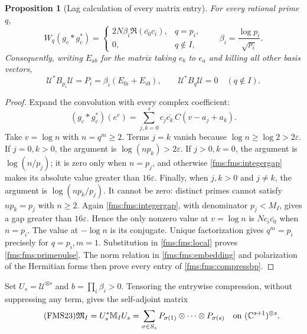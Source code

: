 \documentclass[11pt,a4paper]{article}
\newtheorem{proposition}[theorem]{Proposition}
\theoremstyle{definition}\newtheorem{definition}[theorem]{Definition}
\newcommand{\C}{\mathbb C}\newcommand{\R}{\mathbb R}
\begin{document}
\begin{proposition}[Lag calculation of every matrix entry]
\label{fms:fms:compression}
For every rational prime $q$,
\begin{equation}\tag{FMS21}\label{fms:fms:primepulse}
 W_q(g_c*g_c^*)=
 \begin{cases}
 2N\beta_i\Re(\overline{c_0}c_i),&q=p_i,\\
 0,&q\notin I,
 \end{cases}
 \qquad \beta_i=\dfrac{\log p_i}{\sqrt{p_i}}.
\end{equation}
Consequently, writing $E_{ab}$ for the matrix taking $e_b$ to
$e_a$ and killing all other basis vectors,
\begin{equation}\tag{FMS22}\label{fms:fms:compressbp}
 \mathcal U^*B_{p_i}\mathcal U=P_i
       =\beta_i(E_{0i}+E_{i0}),\qquad
 \mathcal U^*B_q\mathcal U=0\quad(q\notin I).
\end{equation}
\end{proposition}
\begin{proof}
Expand the convolution with every complex coefficient:
\[
 (g_c*g_c^*)(e^v)=
 \sum_{j,k=0}^s c_j\overline{c_k}\,
                  C(v-a_j+a_k).
\]
Take $v=\log n$ with $n=q^m\ge2$. Terms $j=k$ vanish because
$\log n\ge\log2>2\varepsilon$. If $j=0,k>0$, the argument is
$\log(np_k)>2\varepsilon$. If $j>0,k=0$, the argument is
$\log(n/p_j)$; it is zero only when $n=p_j$, and otherwise
\eqref{fms:fms:integergap} makes its absolute value greater than
$16\varepsilon$. Finally, when $j,k>0$ and $j\ne k$, the
argument is $\log(np_k/p_j)$. It cannot be zero: distinct primes
cannot satisfy $np_k=p_j$ with $n\ge2$. Again
\eqref{fms:fms:integergap}, with denominator $p_j<M_I$, gives a
gap greater than $16\varepsilon$. Hence the only nonzero value
at $v=\log n$ is $Nc_i\overline{c_0}$ when $n=p_i$.
The value at $-\log n$ is its conjugate. Unique factorization
gives $q^m=p_i$ precisely for $q=p_i,m=1$.
Substitution in \eqref{fms:fms:local} proves
\eqref{fms:fms:primepulse}. The norm relation in
\eqref{fms:fms:embedding} and polarization of the Hermitian forms
then prove every entry of \eqref{fms:fms:compressbp}.
\end{proof}

Set $U_s=\mathcal U^{\otimes s}$ and $b=\prod_i\beta_i>0$.
Tensoring the entrywise compression, without suppressing any term,
gives the self-adjoint matrix
\begin{equation}\tag{FMS23}\label{fms:fms:finitemixed}
 \mathfrak M_I=U_s^*\mathbb M_IU_s
       =\sum_{\sigma\in S_s}
          P_{\sigma(1)}\otimes\cdots\otimes P_{\sigma(s)}
 \quad\hbox{on }(\C^{s+1})^{\otimes s}.
\end{equation}
\end{document}
